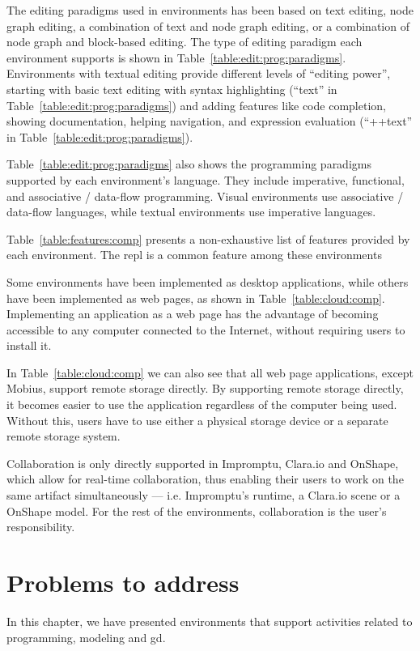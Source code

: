 The editing paradigms used in environments has been based on text editing, node graph editing, a combination of text and node graph editing, or a combination of node graph and block-based editing.
The type of editing paradigm each environment supports is shown in Table~\ref{table:edit:prog:paradigms}.
Environments with textual editing provide different levels of ``editing power'', starting with basic text editing with syntax highlighting (``text'' in Table~\ref{table:edit:prog:paradigms}) and adding features like code completion, showing documentation, helping navigation, and expression evaluation (``++text'' in Table~\ref{table:edit:prog:paradigms}).

Table~\ref{table:edit:prog:paradigms} also shows the programming paradigms supported by each environment's language.
They include imperative, functional, and associative / data-flow programming.
Visual environments use associative / data-flow languages, while textual environments use imperative languages.

Table~\ref{table:features:comp} presents a non-exhaustive list of features provided by each environment.
The \gls{repl} is a common feature among these environments

Some environments have been implemented as desktop applications, while others have been implemented as web pages, as shown in Table~\ref{table:cloud:comp}.
Implementing an application as a web page has the advantage of becoming accessible to any computer connected to the Internet, without requiring users to install it.

In Table~\ref{table:cloud:comp} we can also see that all web page applications, except Mobius, support remote storage directly.
By supporting remote storage directly, it becomes easier to use the application regardless of the computer being used.
Without this, users have to use either a physical storage device or a separate remote storage system.

Collaboration is only directly supported in Impromptu, Clara.io and OnShape, which allow for real-time collaboration, thus enabling their users to work on the same artifact simultaneously --- i.e. Impromptu's runtime, a Clara.io scene or a OnShape model.
For the rest of the environments, collaboration is the user's responsibility.


\section{Problems to address}
In this chapter, we have presented environments that support activities related to programming, modeling and \gls{gd}.

